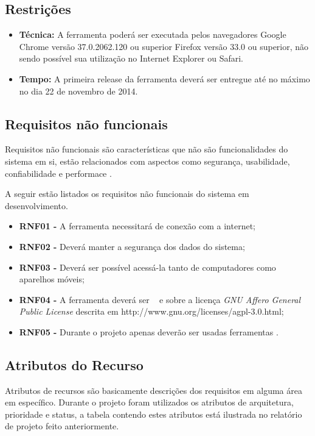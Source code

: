 \subsection{Restrições}

\begin{itemize}
	\item \textbf{Técnica:}
		A ferramenta poderá ser executada pelos navegadores Google Chrome versão 37.0.2062.120 ou superior Firefox versão 33.0 ou superior, não sendo possível sua utilização no Internet Explorer ou Safari.
	\item \textbf{Tempo:}
		A primeira release da ferramenta deverá ser entregue até no máximo no dia 22 de novembro de 2014.
\end{itemize}

\subsection{Requisitos não funcionais}

Requisitos não funcionais são características que não são funcionalidades do sistema em si, estão relacionados com aspectos como segurança, usabilidade, confiabilidade e performace \cite{derequisitos}.

A seguir estão listados os requisitos não funcionais do sistema em desenvolvimento.

\begin{itemize}
	\item \textbf{RNF01 - }A ferramenta necessitará de conexão com a internet;
	\item \textbf{RNF02 - }Deverá manter a segurança dos dados do sistema;
	\item \textbf{RNF03 - }Deverá ser possível acessá-la tanto de computadores como aparelhos móveis;
	\item \textbf{RNF04 - }A ferramenta deverá ser \opensource~ e sobre a licença \textit{GNU Affero General Public License} descrita em http://www.gnu.org/licenses/agpl-3.0.html;
	\item \textbf{RNF05 - }Durante o projeto apenas deverão ser usadas ferramentas \opensource.
\end{itemize}


\subsection{Atributos do Recurso}

Atributos de recursos são basicamente descrições dos requisitos em alguma área em específico. Durante o projeto foram utilizados os atributos de arquitetura, prioridade e status, a tabela contendo estes atributos está ilustrada no relatório de projeto feito anteriormente.